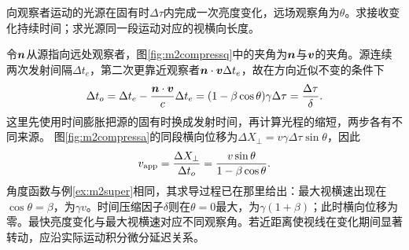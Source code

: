 \begin{example}\label{ex:m2timecompression}
向观察者运动的光源在固有时$\Delta\tau$内完成一次亮度变化，远场观察角为$\theta$。求接收变化持续时间；求光源同一段运动对应的视横向长度。
\end{example}
\begin{solution}
令$\bm{n}$从源指向远处观察者，图\ref{fig:m2compressq}中的夹角为$\bm{n}$与$\bm{v}$的夹角。源连续两次发射间隔$\Delta t_e$，第二次更靠近观察者$\bm{n}\cdot\bm{v}\Delta t_e$，故在方向近似不变的条件下
\[
 \Delta t_o=\Delta t_e-\frac{\bm{n}\cdot\bm{v}}{c}\Delta t_e
 =(1-\beta\cos\theta)\gamma\Delta\tau
 =\frac{\Delta\tau}{\delta}.
\]
这里先使用时间膨胀把源的固有时换成发射时间，再计算光程的缩短，两步各有不同来源。
图\ref{fig:m2compressa}的同段横向位移为$\Delta X_\perp=v\gamma\Delta\tau\sin\theta$，因此
\[
 v_{\rm app}=\frac{\Delta X_\perp}{\Delta t_o}
 =\frac{v\sin\theta}{1-\beta\cos\theta}.
\]
角度函数与例\ref{ex:m2super}相同，其求导过程已在那里给出：最大视横速出现在$\cos\theta=\beta$，为$\gamma v$。时间压缩因子$\delta$则在$\theta=0$最大，为$\gamma(1+\beta)$；此时横向位移为零。最快亮度变化与最大视横速对应不同观察角。若近距离使视线在变化期间显著转动，应沿实际运动积分微分延迟关系。
\end{solution}
